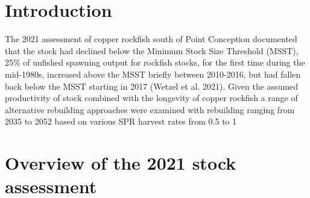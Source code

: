 \documentclass[11pt,
  english,
  a4paper,
]{article}
\begin{document}
\leavevmode\tagmcend\tagstructend\par

\pagebreak
\setlength{\parskip}{5mm plus1mm minus1mm}
\setcounter{page}{1}
\renewcommand{\thefigure}{\arabic{figure}}
\renewcommand{\thetable}{\arabic{table}}
\setcounter{table}{0}
\setcounter{figure}{0}

\setlength\parskip{0.2em plus 0.1em minus 0.2em}


\hypertarget{introduction}{%
\section{Introduction}\label{introduction}}

\leavevmode\tagmcend\tagstructend


The 2021 assessment of copper rockfish south of Point Conception documented that the stock had declined below the Minimum Stock Size Threshold (MSST), 25\% of unfished spawning output for rockfish stocks, for the first time during the mid-1980s, increased above the MSST briefly between 2010-2016, but had fallen back below the MSST starting in 2017 {(Wetzel et al. 2021)\leavevmode\tagmcend\tagstructend}. Given the assumed productivity of stock combined with the longevity of copper rockfish a range of alternative rebuilding approaches were examined with rebuilding ranging from 2035 to 2052 based on various SPR harvest rates from 0.5 to 1

\leavevmode\tagmcend\tagstructend\par


\hypertarget{overview-of-the-2021-stock-assessment}{%
\section{Overview of the 2021 stock assessment}\label{overview-of-the-2021-stock-assessment}}

\leavevmode\tagmcend\tagstructend

\end{document}
